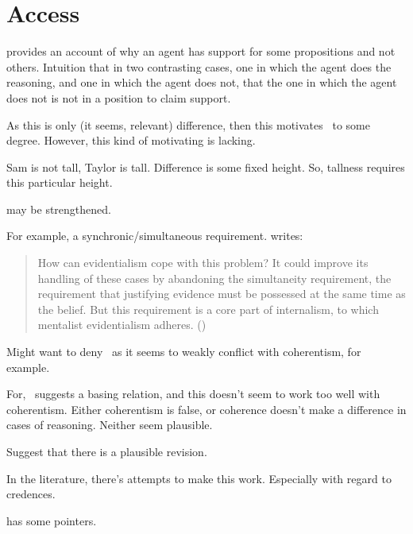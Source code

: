 \chapter{Access}
\label{cha:access}



\begin{note}
  \ESU{} provides an account of why an agent has support for some propositions and not others.
  Intuition that in two contrasting cases, one in which the agent does the reasoning, and one in which the agent does not, that the one in which the agent does not is not in a position to claim support.

  As this is only (it seems, relevant) difference, then this motivates~\ESU{} to some degree.
  However, this kind of motivating is lacking.

  Sam is not tall, Taylor is tall.
  Difference is some fixed height.
  So, tallness requires this particular height.
\end{note}

\begin{note}
  \ESU{} may be strengthened.

  For example, a synchronic/simultaneous requirement.
  \citeauthor{Goldman:2011vn} writes:
  \begin{quote}
    How can evidentialism cope with this problem? It could improve its handling of these cases by abandoning the simultaneity requirement, the requirement that justifying evidence must be possessed at the same time as the belief. But this requirement is a core part of internalism, to which mentalist evidentialism adheres.\nolinebreak
    \mbox{}\hfill\mbox{(\citeyear[261]{Goldman:2011vn})}
  \end{quote}
\end{note}

\begin{note}
  Might want to deny~\ESU{} as it seems to weakly conflict with coherentism, for example.

  For,~\ESU{} suggests a basing relation, and this doesn't seem to work too well with coherentism.
  Either coherentism is false, or coherence doesn't make a difference in cases of reasoning.
  Neither seem plausible.

  Suggest that there is a plausible revision.

  In the literature, there's attempts to make this work.
  Especially with regard to credences.

  \textcite[\S2]{Silva:2020aa} has some pointers.
\end{note}

